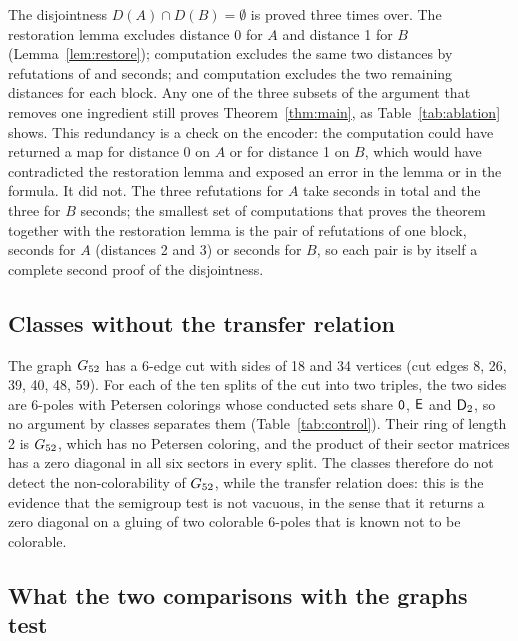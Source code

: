 The disjointness $D(A) \cap D(B) = \emptyset$ is proved three times over. The restoration lemma excludes distance 0 for $A$ and distance 1 for $B$
(Lemma~\ref{lem:restore}); computation excludes the same two distances by refutations of \nAtZero{} and \nBtOne{} seconds; and computation
excludes the two remaining distances for each block. Any one of the three subsets of the argument that removes one ingredient still proves
Theorem~\ref{thm:main}, as Table~\ref{tab:ablation} shows. This redundancy is a check on the encoder: the computation could have
returned a map for distance 0 on $A$ or for distance 1 on $B$, which would have contradicted the restoration lemma and exposed an error in the lemma or
in the formula. It did not. The three refutations for $A$ take \nSumAref{} seconds in total and the three for $B$ \nSumBref{} seconds; the smallest set of computations that proves
the theorem together with the restoration lemma is the pair of refutations of one block, \nPairA{} seconds for $A$ (distances 2 and 3) or \nPairB{} seconds for $B$, so each pair is by itself a complete second proof of the disjointness.

\subsection{Classes without the transfer relation}\label{sec:ablation-control}

The graph $G_{52}$ has a 6-edge cut with sides of 18 and 34 vertices (cut edges 8, 26, 39, 40, 48, 59). For each of the ten splits of the cut into two triples,
the two sides are 6-poles with Petersen colorings whose conducted sets share $\mathsf{0}$, $\mathsf{E}$ and $\mathsf{D}_2$, so no argument by classes separates them
(Table~\ref{tab:control}). Their ring of length 2 is $G_{52}$, which has no Petersen coloring, and the product of their sector matrices has a zero diagonal in all six
sectors in every split. The classes therefore do not detect the non-colorability of $G_{52}$, while the transfer relation does: this is the evidence that the
semigroup test is not vacuous, in the sense that it returns a zero diagonal on a gluing of two colorable 6-poles that is known not to be colorable.



\subsection{What the two comparisons with the graphs test}\label{sec:ablation-direction}

